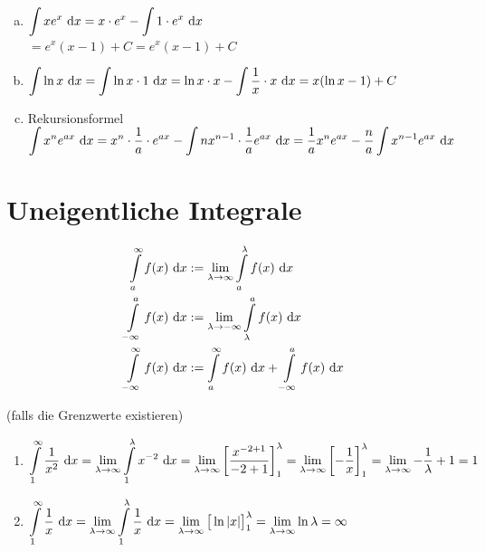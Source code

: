 \Bsp
\begin{enumerate}[a)]
	\item $\displaystyle\int xe^x\ \mathrm{d}x=x\cdot e^x-\displaystyle\int1\cdot e^x\ \mathrm{d}x$\\
	$=e^x(x-1)+C=e^x(x-1)+C$
	
	\item $\displaystyle\int\ln x\ \mathrm{d}x=\displaystyle\int\ln x\cdot1\ \mathrm{d}x=\ln x\cdot x-\displaystyle\int\dfrac{1}{x}\cdot x\ \mathrm{d}x=x(\ln x-1)+C$
	
	\item Rekursionsformel\\
	$\displaystyle\int x^ne^{ax}\ \mathrm{d}x=x^n\cdot\frac{1}{a}\cdot e^{ax}-\displaystyle\int nx^{n-1}\cdot\frac{1}{a}e^{ax}\ \mathrm{d}x=\frac{1}{a}x^ne^{ax}-\frac{n}{a}\displaystyle\int x^{n-1}e^{ax}\ \mathrm{d}x$
\end{enumerate}

\clearpage
\section{Uneigentliche Integrale}
\Def
\begin{align*}
\displaystyle\int\limits_{a}^{\infty}f(x)\ \mathrm{d}x&:=\lim\limits_{\lambda\to\infty}\displaystyle\int\limits_{a}^{\lambda}f(x)\ \mathrm{d}x\\
\displaystyle\int\limits_{-\infty}^{a}f(x)\ \mathrm{d}x&:=\lim\limits_{\lambda\to-\infty}\displaystyle\int\limits_{\lambda}^{a}f(x)\ \mathrm{d}x\\
\displaystyle\int\limits_{-\infty}^{\infty}f(x)\ \mathrm{d}x&:=\displaystyle\int\limits_{a}^{\infty}f(x)\ \mathrm{d}x+\displaystyle\int\limits_{-\infty}^{a}f(x)\ \mathrm{d}x\\
\end{align*}

(falls die Grenzwerte existieren)

\Bsps
\begin{enumerate}
	\item $\displaystyle\int\limits_{1}^{\infty}\dfrac{1}{x^2}\ \mathrm{d}x=\lim\limits_{\lambda\to\infty}\displaystyle\int\limits_{1}^{\lambda}x^{-2}\ \mathrm{d}x=\lim\limits_{\lambda\to\infty}\left[\dfrac{x^{-2+1}}{-2+1}\right]_1^\lambda=\lim\limits_{\lambda\to\infty}\left[-\dfrac{1}{x}\right]_1^\lambda=\lim\limits_{\lambda\to\infty}-\dfrac{1}{\lambda}+1=1$
	
	\item $\displaystyle\int\limits_{1}^{\infty}\dfrac{1}{x}\ \mathrm{d}x=\lim\limits_{\lambda\to\infty}\displaystyle\int\limits_{1}^{\lambda}\dfrac{1}{x}\ \mathrm{d}x=\lim\limits_{\lambda\to\infty}\big[\ln|x|\big]_1^\lambda=\lim\limits_{\lambda\to\infty}\ln\lambda=\infty$
\end{enumerate}

